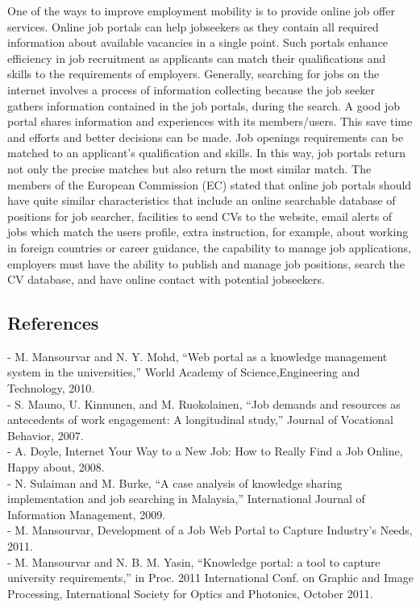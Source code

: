 \documentclass[a4paper,12pt]{report}
\begin{document}
\hspace*{12pt}One of the ways to improve employment mobility is to provide online job offer services. Online job portals can help jobseekers as they contain all required information about available vacancies in a single point. Such portals enhance efficiency in job recruitment as applicants can match their qualifications and skills to the requirements of employers. Generally, searching for jobs on the internet involves a process of information collecting because the job seeker gathers information contained in the job portals, during the search. A good job portal shares information and experiences with its members/users. This save time and efforts and better decisions can be made. Job openings requirements can be matched to an applicant's qualification and skills. In this way, job portals return not only the precise matches but also return the most similar match. The members of the European Commission (EC) stated that online job portals should have quite similar characteristics that include an online searchable database of positions for job searcher, facilities to send CVs to the website, email alerts of jobs which match the users profile, extra instruction, for example, about working in foreign countries or career guidance, the capability to manage job applications, employers must have the ability to publish and manage job positions, search the CV database, and have online contact with potential jobseekers.\\
\pagebreak

\subsection{References}
\hspace*{12pt}
\subitem - M. Mansourvar and N. Y. Mohd, “Web portal as a knowledge management system in the universities,” World Academy of Science,Engineering and Technology, 2010.\\
\subitem - S. Mauno, U. Kinnunen, and M. Ruokolainen, “Job demands and resources as antecedents of work engagement: A longitudinal study,” Journal of Vocational Behavior, 2007.\\
\subitem - A. Doyle, Internet Your Way to a New Job: How to Really Find a Job Online, Happy about, 2008.\\
\subitem - N. Sulaiman and M. Burke, “A case analysis of knowledge sharing implementation and job searching in Malaysia,” International Journal of Information Management, 2009.\\
\subitem - M. Mansourvar, Development of a Job Web Portal to Capture Industry’s Needs, 2011.\\
\subitem - M. Mansourvar and N. B. M. Yasin, “Knowledge portal: a tool to capture university requirements,” in Proc. 2011 International Conf. on Graphic and Image Processing, International Society for Optics and Photonics, October 2011.
\end{document}
